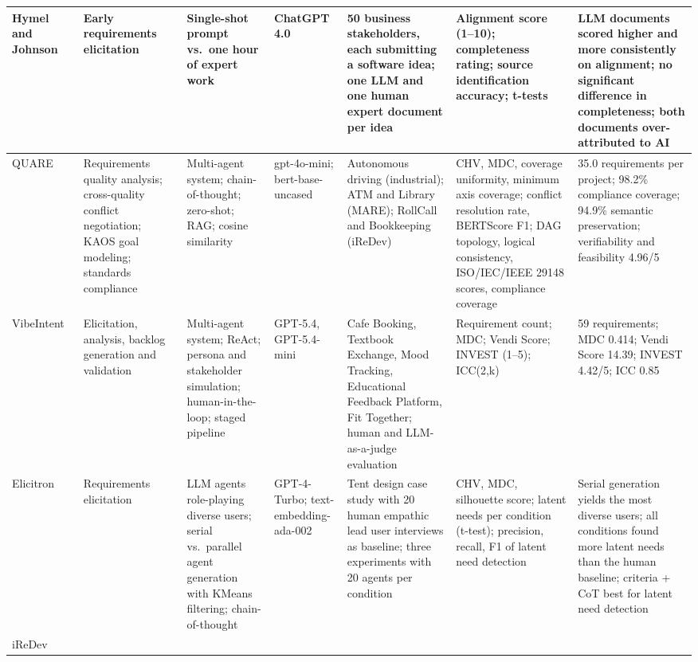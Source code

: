 \begin{appendices}
\begin{landscape}
\begin{longtable}{|p{2.0cm}|p{2.6cm}|p{2.6cm}|p{2.2cm}|p{4.0cm}|p{4.0cm}|p{4.4cm}|}
    \hline
    Hymel and Johnson~\cite{hymel2025analysis} &
    Early requirements elicitation &
    Single-shot prompt vs.\ one hour of expert work &
    ChatGPT 4.0 &
    50 business stakeholders, each submitting a software idea; one LLM and one human expert document per idea &
    Alignment score (1--10); completeness rating; source identification accuracy; t-tests &
    LLM documents scored higher and more consistently on alignment; no significant difference in completeness; both documents over-attributed to AI \\
    \hline
    QUARE~\cite{cheng2026quare} &
    Requirements quality analysis; cross-quality conflict negotiation; KAOS goal modeling; standards compliance &
    Multi-agent system; chain-of-thought; zero-shot; RAG; cosine similarity &
    gpt-4o-mini; bert-base-uncased &
    Autonomous driving (industrial); ATM and Library (MARE); RollCall and Bookkeeping (iReDev) &
    CHV, MDC, coverage uniformity, minimum axis coverage; conflict resolution rate, BERTScore F1; DAG topology, logical consistency, ISO/IEC/IEEE 29148 scores, compliance coverage &
    35.0 requirements per project; 98.2\% compliance coverage; 94.9\% semantic preservation; verifiability and feasibility 4.96/5 \\
    \hline
    VibeIntent~\cite{vibeintent2026} &
    Elicitation, analysis, backlog generation and validation &
    Multi-agent system; ReAct; persona and stakeholder simulation; human-in-the-loop; staged pipeline &
    GPT-5.4, GPT-5.4-mini &
    Cafe Booking, Textbook Exchange, Mood Tracking, Educational Feedback Platform, Fit Together; human and LLM-as-a-judge evaluation &
    Requirement count; MDC; Vendi Score; INVEST (1--5); ICC(2,k) &
    59 requirements; MDC 0.414; Vendi Score 14.39; INVEST 4.42/5; ICC 0.85 \\
    \hline
    Elicitron~\cite{ataei2025elicitron} &
    Requirements elicitation &
    LLM agents role-playing diverse users; serial vs.\ parallel agent generation with KMeans filtering; chain-of-thought &
    GPT-4-Turbo; text-embedding-ada-002 &
    Tent design case study with 20 human empathic lead user interviews as baseline; three experiments with 20 agents per condition &
    CHV, MDC, silhouette score; latent needs per condition (t-test); precision, recall, F1 of latent need detection &
    Serial generation yields the most diverse users; all conditions found more latent needs than the human baseline; criteria + CoT best for latent need detection \\
    \hline
    iReDev~\cite{jin2025iredev} &

\end{longtable}
\end{landscape}
\end{appendices}
